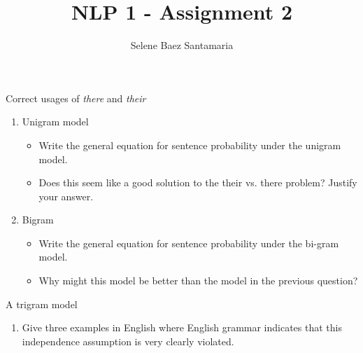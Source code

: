 \documentclass[12pt]{article}
\newenvironment{exercise}[2][Exercise]{\begin{trivlist}
\item[\hskip \labelsep {\bfseries #1}\hskip \labelsep {\bfseries #2.}]}{\end{trivlist}}
\begin{document}
 
 
 
\title{NLP 1 - Assignment 2}%
\author{Selene Baez Santamaria} %
\maketitle
 
\begin{exercise}{1. Spelling corrector} Correct usages of \textit{there} and \textit{their}
	
\begin{enumerate}[label=(\alph*)]

\item Unigram model \\
	\begin{itemize}
	\item Write the general equation for sentence probability under the unigram model.
	
	\item Does this seem like a good solution to the their vs. there problem? Justify your answer.
	
	\end{itemize}
		  
\item Bigram \\
	\begin{itemize}
	\item Write the general equation for sentence probability under the bi-gram model.
	
	\item Why might this model be better than the model in the previous question?
	
	\end{itemize}

\end{enumerate}
\end{exercise}
 
\begin{exercise}{2. Second order Markov assumption} A trigram model
\begin{enumerate}[label=(\alph*)]
	\item Give three examples in English where English grammar indicates that this independence assumption is very clearly violated.
\end{enumerate}
\end{exercise}
\end{document}
